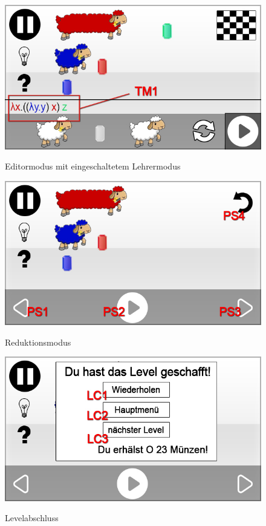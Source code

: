 \begin{figure}[H]
\centering
{}\label{fig:game_teachermode}
\includegraphics[scale=0.55]{../gui/_jpeg_numeration/game_teachermode.jpg}
\caption{Editormodus mit eingeschaltetem Lehrermodus}
\end{figure}

\begin{figure}[H]
\centering
{}\label{fig:game_play_started}
\includegraphics[scale=0.55]{../gui/_jpeg_numeration/game_play_started.jpg}
\caption{Reduktionsmodus}
\end{figure}

\begin{figure}[H]
\centering
{}\label{fig:game_completed}
\includegraphics[scale=0.55]{../gui/_jpeg_numeration/game_completed.jpg}
\caption{Levelabschluss}
\end{figure}

